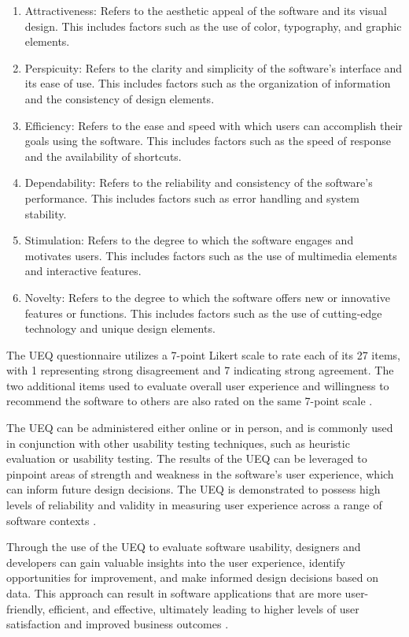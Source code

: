 \documentclass[conference,onecolumn]{IEEEtran}
\begin{document}
        \begin{enumerate}
            \item	Attractiveness: Refers to the aesthetic appeal of the software and its visual design. This includes factors such as the use of color, typography, and graphic elements.
            \item	Perspicuity: Refers to the clarity and simplicity of the software's interface and its ease of use. This includes factors such as the organization of information and the consistency of design elements.
            \item	Efficiency: Refers to the ease and speed with which users can accomplish their goals using the software. This includes factors such as the speed of response and the availability of shortcuts.
            \item	Dependability: Refers to the reliability and consistency of the software's performance. This includes factors such as error handling and system stability.
            \item	Stimulation: Refers to the degree to which the software engages and motivates users. This includes factors such as the use of multimedia elements and interactive features.
            \item	Novelty: Refers to the degree to which the software offers new or innovative features or functions. This includes factors such as the use of cutting-edge technology and unique design elements.
        \end{enumerate}
        
        The UEQ questionnaire utilizes a 7-point Likert scale to rate each of its 27 items, with 1 representing strong disagreement and 7 indicating strong agreement. The two additional items used to evaluate overall user experience and willingness to recommend the software to others are also rated on the same 7-point scale \cite{laugwitz2008construction}.

        The UEQ can be administered either online or in person, and is commonly used in conjunction with other usability testing techniques, such as heuristic evaluation or usability testing. The results of the UEQ can be leveraged to pinpoint areas of strength and weakness in the software's user experience, which can inform future design decisions. The UEQ is demonstrated to possess high levels of reliability and validity in measuring user experience across a range of software contexts \cite{hassenzahl2006user}.

        Through the use of the UEQ to evaluate software usability, designers and developers can gain valuable insights into the user experience, identify opportunities for improvement, and make informed design decisions based on data. This approach can result in software applications that are more user-friendly, efficient, and effective, ultimately leading to higher levels of user satisfaction and improved business outcomes \cite{brooke1996sus}.
\end{document}
